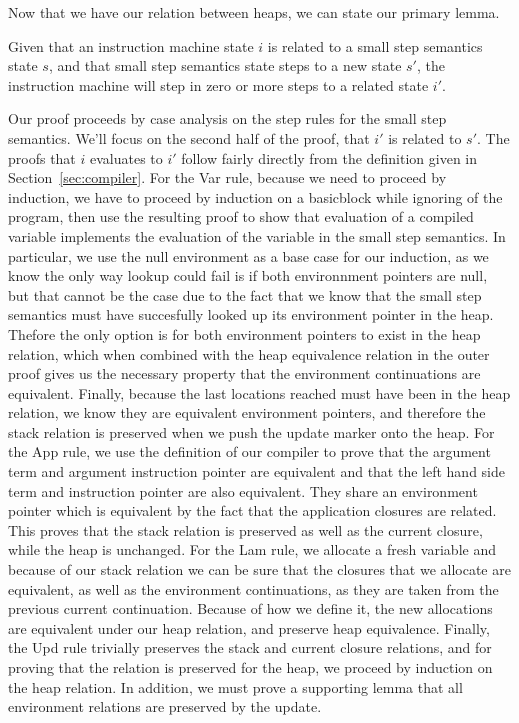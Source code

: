 Now that we have our relation between heaps, we can state our primary lemma.
\begin{lemma} \label{lem:cesm_im}
Given that an instruction machine state $i$ is related to a small step
semantics state $s$, and that small step semantics state steps to a new state
$s'$, the instruction machine will step in zero or more steps to a related state
$i'$.
\end{lemma}
\begin{proofoutline}
Our proof proceeds by case analysis on the step rules for the small step
semantics. We'll focus on the second half of the proof, that $i'$ is related to
$s'$. The proofs that $i$ evaluates to $i'$ follow fairly directly from the
definition given in Section~\ref{sec:compiler}. For the Var rule, because we need to
proceed by induction, we have to proceed by induction on a basicblock while
ignoring of the program, then use the resulting proof to show that evaluation of
a compiled variable implements the evaluation of the variable in the small step
semantics. In particular, we use the null environment as a base case for our
induction, as we know the only way lookup could fail is if both environnment
pointers are null, but that cannot be the case due to the fact that we know that
the small step semantics must have succesfully looked up its environment pointer
in the heap. Thefore the only option is for both environment pointers to exist
in the heap relation, which when combined with the heap equivalence relation in
the outer proof gives us the necessary property that the environment
continuations are equivalent. Finally, because the last locations reached must
have been in the heap relation, we know they are equivalent environment
pointers, and therefore the stack relation is preserved when we push the update
marker onto the heap. For the App rule, we use the definition of our compiler to
prove that the argument term and argument instruction pointer are equivalent and
that the left hand side term and instruction pointer are also equivalent. They
share an environment pointer which is equivalent by the fact that the
application closures are related. This proves that the stack relation is
preserved as well as the current closure, while the heap is unchanged. For the
Lam rule, we allocate a fresh variable and because of our stack relation we can
be sure that the closures that we allocate are equivalent, as well as the
environment continuations, as they are taken from the previous current
continuation. Because of how we define it, the new allocations are equivalent
under our heap relation, and preserve heap equivalence. Finally, the Upd rule
trivially preserves the stack and current closure relations, and for proving
that the relation is preserved for the heap, we proceed by induction on the heap
relation. In addition, we must prove a supporting lemma that all environment
relations are preserved by the update. 
\end{proofoutline}

